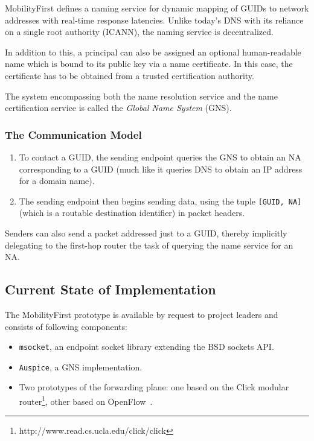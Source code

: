                 MobilityFirst defines a naming service for dynamic mapping of GUIDs to network addresses with real-time response latencies. Unlike today's DNS with its reliance on a single root authority (ICANN), the naming service is decentralized.

                In addition to this, a principal can also be assigned an optional human-readable name which is bound to its public key via a name certificate. In this case, the certificate has to be obtained from a trusted certification authority.

                The system encompassing both the name resolution service and the name certification service is called the \emph{Global Name System} (GNS).

            \subsubsection{The Communication Model}

                \begin{enumerate}
                    \item To contact a GUID, the sending endpoint queries the GNS to obtain an NA corresponding to a GUID (much like it queries DNS to obtain an IP address for a domain name).
                    \item The sending endpoint then begins sending data, using the tuple \texttt{[GUID, NA]} (which is a routable destination identifier) in packet headers.
                \end{enumerate}

                Senders can also send a packet addressed just to a GUID, thereby implicitly delegating to the first-hop router the task of querying the name service for an NA.

        \subsection{Current State of Implementation}

            The MobilityFirst prototype is available by request to project leaders and consists of following components:

            \begin{itemize}
                \item \texttt{msocket}, an endpoint socket library extending the BSD sockets API.
                \item \texttt{Auspice}, a GNS implementation.
                \item Two prototypes of the forwarding plane: one based on the Click modular router\footnote{http://www.read.cs.ucla.edu/click/click}, other based on OpenFlow~\cite{openflow}.
            \end{itemize}

